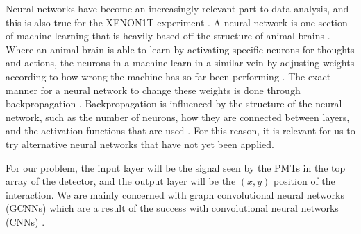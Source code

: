 \documentclass[../thesis.tex]{subfiles}
\begin{document}
Neural networks have become an increasingly relevant part to data analysis, and this is also true for the XENON1T experiment \cite{Bart}.
A neural network is one section of machine learning that is heavily based off the structure of animal brains \cite{deep-learning}.
Where an animal brain is able to learn by activating specific neurons for thoughts and actions, the neurons in a machine learn in a similar vein by adjusting weights according to how wrong the machine has so far been performing \cite{deep-learning}.
The exact manner for a neural network to change these weights is done through backpropagation \cite{deep-learning}.
Backpropagation is influenced by the structure of the neural network, such as the number of neurons, how they are connected between layers, and the activation functions that are used \cite{deep-learning}.
For this reason, it is relevant for us to try alternative neural networks that have not yet been applied.

\par For our problem, the input layer will be the signal seen by the PMTs in the top array of the detector, and the output layer will be the $(x,y)$ position of the interaction.
We are mainly concerned with graph convolutional neural networks (GCNNs) which are a result of the success with convolutional neural networks (CNNs) \cite{GCNN_Kipf}.
\end{document}

